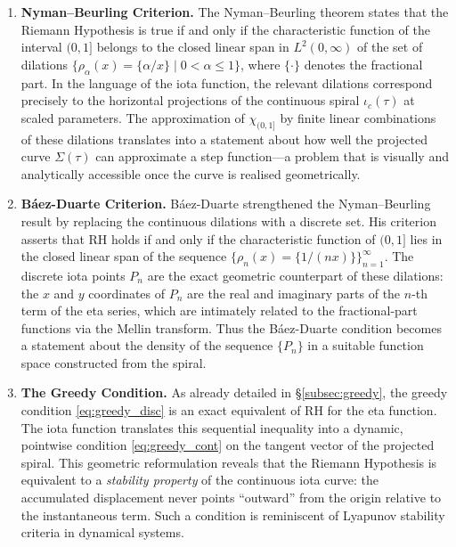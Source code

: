 \documentclass[11pt]{article}
\begin{document}
\begin{enumerate}
  \item \textbf{Nyman--Beurling Criterion.}  The Nyman--Beurling theorem states that the Riemann Hypothesis is true if and only if the characteristic function of the interval $(0,1]$ belongs to the closed linear span in $L^2(0,\infty)$ of the set of dilations $\{ \rho_\alpha(x) = \{\alpha/x\} \mid 0 < \alpha \le 1 \}$, where $\{\cdot\}$ denotes the fractional part.  In the language of the iota function, the relevant dilations correspond precisely to the horizontal projections of the continuous spiral $\iota_c(\tau)$ at scaled parameters.  The approximation of $\chi_{(0,1]}$ by finite linear combinations of these dilations translates into a statement about how well the projected curve $\Sigma(\tau)$ can approximate a step function—a problem that is visually and analytically accessible once the curve is realised geometrically.

  \item \textbf{B\'aez-Duarte Criterion.}  B\'aez-Duarte strengthened the Nyman--Beurling result by replacing the continuous dilations with a discrete set.  His criterion asserts that RH holds if and only if the characteristic function of $(0,1]$ lies in the closed linear span of the sequence $\{ \rho_n(x) = \{1/(nx)\} \}_{n=1}^\infty$.  The discrete iota points $P_n$ are the exact geometric counterpart of these dilations: the $x$ and $y$ coordinates of $P_n$ are the real and imaginary parts of the $n$-th term of the eta series, which are intimately related to the fractional‑part functions via the Mellin transform.  Thus the B\'aez-Duarte condition becomes a statement about the density of the sequence $\{P_n\}$ in a suitable function space constructed from the spiral.

  \item \textbf{The Greedy Condition.}  As already detailed in \S\ref{subsec:greedy}, the greedy condition \eqref{eq:greedy_disc} is an exact equivalent of RH for the eta function.  The iota function translates this sequential inequality into a dynamic, pointwise condition \eqref{eq:greedy_cont} on the tangent vector of the projected spiral.  This geometric reformulation reveals that the Riemann Hypothesis is equivalent to a \emph{stability property} of the continuous iota curve: the accumulated displacement never points ``outward'' from the origin relative to the instantaneous term.  Such a condition is reminiscent of Lyapunov stability criteria in dynamical systems.


\end{enumerate}
\end{document}
